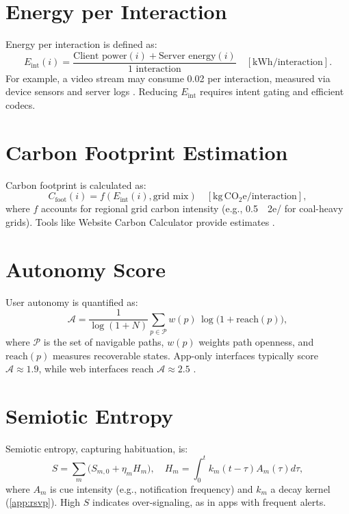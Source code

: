 \documentclass[openany]{book}
\newcommand{\Sent}{S} %
\newcommand{\Eint}{E_{\mathrm{int}}} %
\newcommand{\Cfoot}{C_{\mathrm{foot}}} %
\newcommand{\Auton}{\mathcal{A}} %
\newcommand{\kWh}{\mathrm{kWh}}
\begin{document}
\section{Energy per Interaction}
\label{sec:metrics-energy}
Energy per interaction is defined as:
\begin{equation}
\label{eq:Eint}
\Eint(i) = \frac{\text{Client power}(i) + \text{Server energy}(i)}{\text{1 interaction}} \quad [\kWh/\text{interaction}].
\end{equation}
For example, a video stream may consume \SI{0.02}{\kWh} per interaction, measured via device sensors and server logs \citep{extentia2024}. Reducing $\Eint$ requires intent gating and efficient codecs.

\section{Carbon Footprint Estimation}
\label{sec:metrics-carbon}
Carbon footprint is calculated as:
\begin{equation}
\label{eq:Cfoot}
\Cfoot(i) = f(\Eint(i), \text{grid mix}) \quad [\mathrm{kg\,CO_2e}/\text{interaction}],
\end{equation}
where $f$ accounts for regional grid carbon intensity (e.g., \SI{0.5}{\kgCO2e/\kWh} for coal-heavy grids). Tools like Website Carbon Calculator provide estimates \citep{colak2024}.

\section{Autonomy Score}
\label{sec:metrics-autonomy}
User autonomy is quantified as:
\begin{equation}
\label{eq:metrics-autonomy}
\Auton = \frac{1}{\log(1+N)}\sum_{p\in \mathcal{P}} w(p)\,\log\big(1+\mathrm{reach}(p)\big),
\end{equation}
where $\mathcal{P}$ is the set of navigable paths, $w(p)$ weights path openness, and $\mathrm{reach}(p)$ measures recoverable states. App-only interfaces typically score $\Auton \approx 1.9$, while web interfaces reach $\Auton \approx 2.5$ \citep{doctorow2022}.

\section{Semiotic Entropy}
\label{sec:metrics-entropy}
Semiotic entropy, capturing habituation, is:
\begin{equation}
\label{eq:metrics-S}
\Sent = \sum_m \big(S_{m,0} + \eta_m H_m\big), \quad H_m = \int_0^t k_m(t-\tau) A_m(\tau) d\tau,
\end{equation}
where $A_m$ is cue intensity (e.g., notification frequency) and $k_m$ a decay kernel (\cref{app:rsvp}). High $\Sent$ indicates over-signaling, as in apps with frequent alerts.
\end{document}
